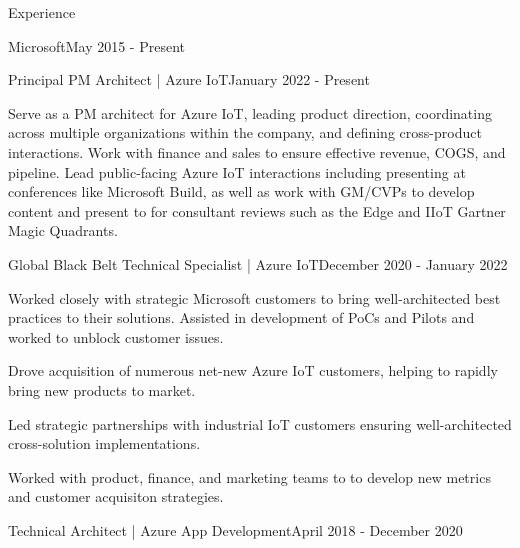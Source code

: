 \documentclass{resume} %
\begin{document}
\begin{rSection}{Experience}


\begin{rSubsection}{Microsoft}{May 2015 - Present}{}{} 


    \begin{rSubSubsection}{Principal PM Architect | Azure IoT}{January 2022 - Present}{}{} 

        \item Serve as a PM architect for Azure IoT, leading product direction, coordinating across multiple organizations within the company, and defining cross-product interactions.  Work with finance and sales to ensure effective revenue, COGS, and pipeline.  Lead public-facing Azure IoT interactions including presenting at conferences like Microsoft Build, as well as work with GM/CVPs to develop content and present to for consultant reviews such as the Edge and IIoT Gartner Magic Quadrants.
        
    \end{rSubSubsection}


    \begin{rSubSubsection}{Global Black Belt Technical Specialist | Azure IoT}{December 2020 - January 2022}{}{} 

        \item Worked closely with strategic Microsoft customers to bring well-architected best practices to their solutions. Assisted in development of PoCs and Pilots and worked to unblock customer issues.  
        \item Drove acquisition of numerous net-new Azure IoT customers, helping to rapidly bring new products to market.
        \item Led strategic partnerships with industrial IoT customers ensuring well-architected cross-solution implementations.
        \item Worked with product, finance, and marketing teams to to develop new metrics and customer acquisiton strategies.
    
    \end{rSubSubsection}


    \begin{rSubSubsection}{Technical Architect | Azure App Development}{April 2018 - December 2020}{}{}


\end{rSubSubsection}
\end{rSubsection}
\end{rSection}
\end{document}
